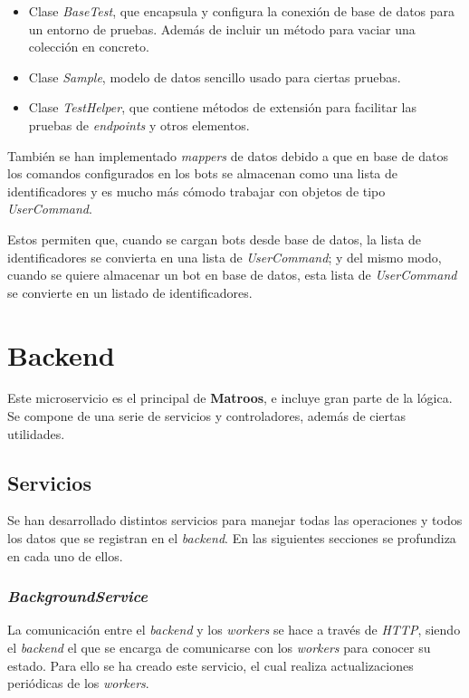 \begin{itemize}
	\item Clase \textit{BaseTest}, que encapsula y configura la conexión de base de datos para un entorno de pruebas. Además de incluir un método para vaciar una colección en concreto.
	\item Clase \textit{Sample}, modelo de datos sencillo usado para ciertas pruebas.
	\item Clase \textit{TestHelper}, que contiene métodos de extensión para facilitar las pruebas de \textit{endpoints} y otros elementos.
\end{itemize}

También se han implementado \textit{mappers} de datos debido a que en base de datos los comandos configurados en los bots se almacenan como una lista de identificadores y es mucho más cómodo trabajar con objetos de tipo \textit{UserCommand}.

Estos permiten que, cuando se cargan bots desde base de datos, la lista de identificadores se convierta en una lista de \textit{UserCommand}; y del mismo modo, cuando se quiere almacenar un bot en base de datos, esta lista de \textit{UserCommand} se convierte en un listado de identificadores.




\section{Backend}

Este microservicio es el principal de \textbf{Matroos}, e incluye gran parte de la lógica. Se compone de una serie de servicios y controladores, además de ciertas utilidades.

\subsection{Servicios}

Se han desarrollado distintos servicios para manejar todas las operaciones y todos los datos que se registran en el \textit{backend}. En las siguientes secciones se profundiza en cada uno de ellos.

\subsubsection{\textit{BackgroundService}}

La comunicación entre el \textit{backend} y los \textit{workers} se hace a través de \textit{HTTP}, siendo el \textit{backend} el que se encarga de comunicarse con los \textit{workers} para conocer su estado. Para ello se ha creado este servicio, el cual realiza actualizaciones periódicas de los \textit{workers}.

